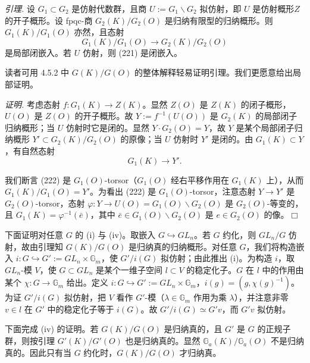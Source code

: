 \emph{引理.} 设 $G_1\subset G_2$ 是仿射代数群，且商 $U:=G_1\backslash G_2$ 拟仿射，即 $U$ 是仿射概形$Z$ 的开子概形。设 fpqc-商 $G_2(K)/G_2(O)$ 是归纳有限型的归纳概形。则 $G_1(K)/G_1(O)$ 亦然，且态射
\begin{equation}\tag{221}
G_1(K)/G_1(O)\to G_2(K)/G_2(O)
\end{equation}
是局部闭嵌入。若 $U$ 仿射，则 (221) 是闭嵌入。

读者可用 4.5.2 中 $G(K)/G(O)$ 的整体解释轻易证明引理。我们更愿意给出局部证明。

\emph{证明.} 考虑态射 $f:G_1(K)\to Z(K)$。显然 $Z(O)$ 是 $Z(K)$ 的闭子概形，$U(O)$ 是 $Z(O)$ 的开子概形。故 $Y:=f^{-1}(U(O))$ 是 $G_2(K)$ 的局部闭子归纳概形；当 $U$ 仿射时它是闭的。显然 $Y\cdot G_2(O)=Y$，故 $Y$ 是某个局部闭子归纳概形 $Y'\subset G_2(K)/G_2(O)$ 的原像；当 $U$ 仿射时 $Y'$ 是闭的。由 $G_1(K)\subset Y$，有自然态射
\begin{equation}\tag{222}
G_1(K)\to Y'.
\end{equation}

我们断言 (222) 是 $G_1(O)$-torsor（$G_1(O)$ 经右平移作用在 $G_1(K)$ 上），从而 $G_1(K)/G_1(O)=Y'$。为看出 (222) 是 $G_1(O)$-torsor，注意态射 $Y\to Y'$ 是 $G_2(O)$-torsor，态射 $\varphi:Y\to U(O)=G_1(O)\backslash G_2(O)$ 是 $G_2(O)$-等变的，且 $G_1(K)=\varphi^{-1}(\bar e)$，其中 $\bar e\in G_1(O)\backslash G_2(O)$ 是 $e\in G_2(O)$ 的像。\hfill$\Box$

下面证明对任意 $G$ 的 (i) 与 (iv)。取嵌入 $G\hookrightarrow GL_n$。若 $G$ 约化，则 $GL_n/G$ 仿射，故由引理知 $G(K)/G(O)$ 是归纳真的归纳概形。对任意 $G$，我们将构造嵌入 $i:G\hookrightarrow G':=GL_n\times\mathbb{G}_m$，使 $G'/i(G)$ 拟仿射；由此推出 (i)。为构造 $i$，取 $GL_n$-模 $V$，使 $G\subset GL_n$ 是某个一维子空间 $l\subset V$ 的稳定化子。$G$ 在 $l$ 中的作用由某个 $\chi:G\to\mathbb{G}_m$ 给出。定义 $i:G\hookrightarrow G':=GL_n\times\mathbb{G}_m$，$i(g)=(g,\chi(g)^{-1})$。为证 $G'/i(G)$ 拟仿射，把 $V$ 看作 $G'$-模（$\lambda\in\mathbb{G}_m$ 作用为乘 $\lambda$），并注意非零 $v\in l$ 在 $G'$ 中的稳定化子等于 $i(G)$。故 $G'/i(G)\simeq G'v$，而 $G'v$ 拟仿射。


下面完成 (iv) 的证明。若 $G(K)/G(O)$ 是归纳真的，且 $G'$ 是 $G$ 的正规子群，则按引理 $G'(K)/G'(O)$ 也是归纳真的。显然 $\mathbb{G}_a(K)/\mathbb{G}_a(O)$ 不是归纳真的。因此只有当 $G$ 约化时，$G(K)/G(O)$ 才归纳真。

